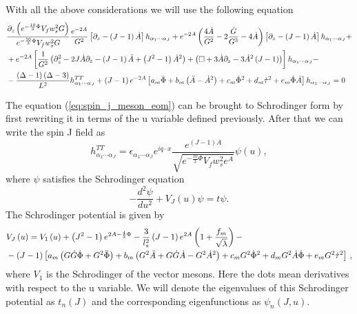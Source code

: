 \documentclass[a4paper,12pt]{article}
\begin{document}
With all the above considerations we will use the following equation
\begin{align}
&\frac{\partial_z \left(e^{-\frac{10}{3}\Phi} V_f w_s^2 G\right)}{e^{-\frac{10}{3}\Phi} V_f w_s^2 G} \frac{e^{-2A}}{G^2} \left[\partial_z - \left(J-1\right) \dot{A} \right]h_{\alpha_1 \cdots \alpha_J} + e^{-2A}\left( \frac{4 \dot{A}}{G^2} - 2 \frac{\dot{G}}{G^3} - 4 \dot{A} \right) \left[\partial_z - \left(J-1\right) \dot{A} \right]h_{\alpha_1  \cdots \alpha_J} + \notag \\
&+e^{-2A} \left[\frac{1}{G^2}\left(\partial_z^2 - 2 J \dot{A} \partial_z - \left(J-1\right) \ddot{A} + \left(J^2-1\right) {\dot{A}}^2 \right)+ \left( \Box + 3\dot{A} \partial_z - 3 {\dot{A}}^2 \left(J-1\right) \right)  \right]h_{\alpha_1 \cdots \alpha_J} - \notag \\
& - \frac{\left(\Delta - 1 \right)\left(\Delta - 3\right)}{L^2} h_{\alpha_1 \cdots \alpha_J}^{TT} + \left(J-1\right) e^{-2A} \left[ a_m \ddot{\Phi} + b_m \left(\ddot{A} - {\dot{A}}^2\right) + c_m {\dot{\Phi}}^2 + d_m {\dot{\tau}}^2 + e_m \dot{\Phi} \dot{A} \right] h_{\alpha_1 \cdots \alpha_J} = 0
\label{eq:spin_j_meson_eom}
\end{align}

The equation (\ref{eq:spin_j_meson_eom}) can be brought to Schrodinger form by first rewriting it in terms of the u variable defined previously. After that we can write the spin J field as
\begin{equation}
h^{TT}_{\alpha_1 \cdots \alpha_J} = \epsilon_{\alpha_1 \cdots \alpha_J} e^{i q \cdot x} \frac{e^{\left(J-1\right)A}}{\sqrt{e^{-\frac{10}{3}\Phi}V_f w_s^2 e^A}} \psi\left(u\right),
\end{equation}
where $\psi$ satisfies the Schrodinger equation
\begin{equation}
- \frac{d^2 \psi}{du^2} + V_J \left(u\right) \psi = t \psi.
\label{eq:schrodinger_problem_meson}
\end{equation}
The Schrodinger potential is given by
\begin{align}
&V_J\left(u\right) = V_1\left(u\right) + \left(J^2 - 1\right) e^{2 A - \frac{4}{3} \Phi} - \frac{3}{l_s^2} \left(J-1\right) e^{2A} \left(1 + \frac{f_m}{\sqrt{\lambda}}\right) - \label{eq:meson_schrodinger_potential} \\
& - \left(J-1\right) \left[a_m \left( G \dot{G} \dot{\Phi} + G^2 \ddot{\Phi} \right) + b_m \left( G^2 \ddot{A} + G \dot{G} \dot{A} -G^2 \dot{A}^2\right) + c_m G^2 \dot{\Phi}^2 + d_m G^2 \dot{A}\dot{\Phi} + e_m G^2 \dot{\tau}^2 \right] \, , \notag
\end{align}
where $V_1$ is the Schrodinger of the vector mesons. Here the dots mean derivatives with respect to the u variable.
We will denote the eigenvalues of this Schrodinger potential as $t_n\left(J\right)$ and the corresponding eigenfunctions as $\psi_n\left(J, u\right)$.
\end{document}
